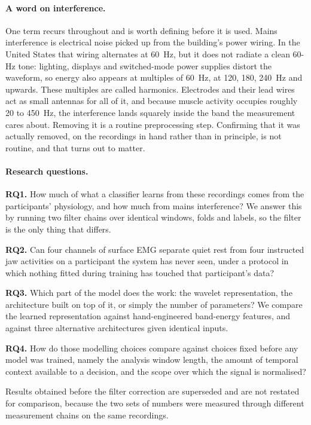 \documentclass[pdflatex,sn-nature,iicol]{sn-jnl}
\begin{document}
\paragraph{A word on interference.} One term recurs throughout and is worth defining before it is used. Mains interference is electrical noise picked up from the building's power wiring. In the United States that wiring alternates at 60~Hz, but it does not radiate a clean 60-Hz tone: lighting, displays and switched-mode power supplies distort the waveform, so energy also appears at multiples of 60~Hz, at 120, 180, 240~Hz and upwards. These multiples are called harmonics. Electrodes and their lead wires act as small antennas for all of it, and because muscle activity occupies roughly 20 to 450~Hz, the interference lands squarely inside the band the measurement cares about. Removing it is a routine preprocessing step. Confirming that it was actually removed, on the recordings in hand rather than in principle, is not routine, and that turns out to matter.

\paragraph{Research questions.}

\textbf{RQ1.} How much of what a classifier learns from these recordings comes from the participants' physiology, and how much from mains interference? We answer this by running two filter chains over identical windows, folds and labels, so the filter is the only thing that differs.

\textbf{RQ2.} Can four channels of surface EMG separate quiet rest from four instructed jaw activities on a participant the system has never seen, under a protocol in which nothing fitted during training has touched that participant's data?

\textbf{RQ3.} Which part of the model does the work: the wavelet representation, the architecture built on top of it, or simply the number of parameters? We compare the learned representation against hand-engineered band-energy features, and against three alternative architectures given identical inputs.

\textbf{RQ4.} How do those modelling choices compare against choices fixed before any model was trained, namely the analysis window length, the amount of temporal context available to a decision, and the scope over which the signal is normalised?

Results obtained before the filter correction are superseded and are not restated for comparison, because the two sets of numbers were measured through different measurement chains on the same recordings.
\end{document}
